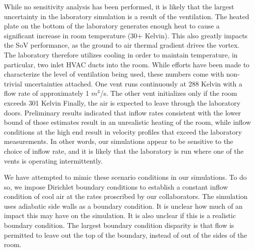 

While no sensitivity analysis has been performed, it is likely that the
largest uncertainty in the laboratory simulation is a result of the
ventilation. The heated plate on the bottom of the laboratory
generates enough heat to cause a significant increase in room
temperature (30+ Kelvin). This also greatly impacts the SoV
performance, as the ground to air thermal gradient drives the
vortex. The laboratory therefore utilizes cooling in order to maintain
temperature, in particular, two inlet HVAC ducts into the room. While
efforts have been made to characterize the level of ventilation being
used, these numbers come with non-trivial uncertainties attached. One
vent runs continuously at 288 Kelvin with a flow rate of approximately 1 
$m^3$/s.
The other vent initializes only if the room exceeds 301 Kelvin
Finally, the air is expected to leave through the laboratory doors.
Preliminary results indicated that 
inflow rates consistent with the lower bound of those estimates result in an
unrealistic heating of the room, while inflow conditions at the high end
result in velocity profiles that exceed the laboratory measurements. In
other words, our simulations appear to be sensitive to the choice of
inflow rate, and it is likely that the laboratory is run where one of
the vents is operating intermittently. 

We have attempted to mimic these scenario conditions in our
simulations. To do so, we impose Dirichlet boundary conditions to
establish a constant inflow condition of cool air at the rates 
proscribed by our collaborators. The simulation uses adiabatic side
walls as a boundary condition. It is unclear how much of an impact this
may have on the simulation. It is also unclear if this is a realistic
boundary condition. The largest boundary condition disparity is that
flow is permitted to leave out the top of the boundary, instead of out
of the sides of the room. 

